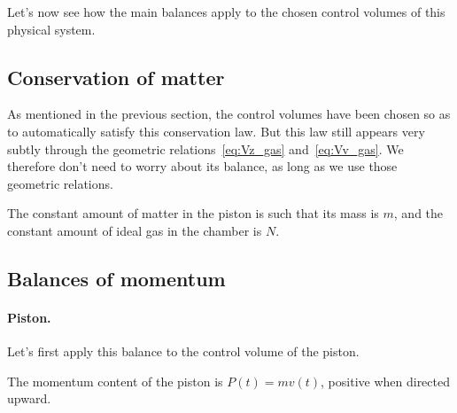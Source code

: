 \documentclass[a4paper,12pt,%
onecolumn,oneside,%
british%
]{memoir}
\renewcommand*{\|}[1][]{\nonscript\:#1\vert\nonscript\:\mathopen{}}
\newcommand*{\yN}{N}
\newcommand*{\ym}{m}%
\begin{document}
\medskip

Let's now see how the main balances apply to the chosen control volumes of this physical system.

\subsection{Conservation of matter}
\label{sec:idealgas_ex_matter}

As mentioned in the previous section, the control volumes have been chosen so as to automatically satisfy this conservation law. But this law still appears very subtly through the geometric relations~\eqref{eq:Vz_gas} and~\eqref{eq:Vv_gas}. We therefore don't need to worry about its balance, as long as we use those geometric relations.

The constant amount of matter in the piston is such that its mass is $\ym$, and the constant amount of ideal gas in the chamber is $\yN$.

\subsection{Balances of momentum}
\label{sec:idealgas_ex_momentum}

\paragraph{Piston.}

Let's first apply this balance to the control volume of the piston.

The momentum content of the piston is $P(t) = \ym v(t)$, positive when directed upward.

\medskip
\end{document}
